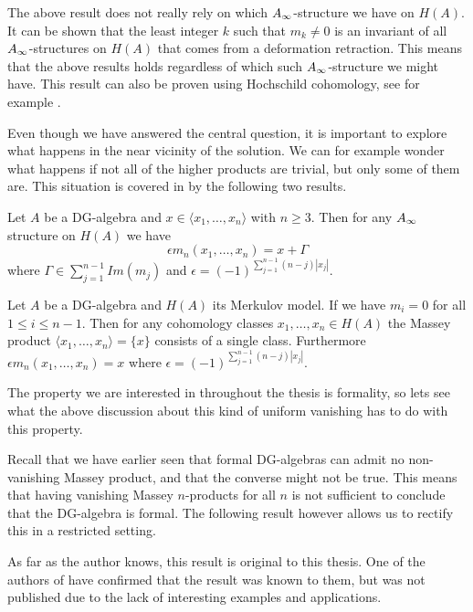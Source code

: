 The above result does not really rely on which $A_{\infty}$-structure we have on $H(A)$. It can be shown that the least integer $k$ such that $m_k \neq 0$ is an invariant of all $A_{\infty}$-structures on $H(A)$ that comes from a deformation retraction. This means that the above results holds regardless of which such $A_{\infty}$-structure we might have. This result can also be proven using Hochschild cohomology, see for example \cite[Theorem 3.3.]{berglund}.

Even though we have answered the central question, it is important to explore what happens in the near vicinity of the solution. We can for example wonder what happens if not all of the higher products are trivial, but only some of them are. This situation is covered in \cite{detection} by the following two results.

\begin{theorem}
Let $A$ be a DG-algebra and $x\in \langle x_1, \ldots, x_n\rangle$ with $n\geq 3$. Then for any $A_{\infty}$ structure on $H(A)$ we have 
\begin{equation*}
    \epsilon m_n(x_1, \ldots, x_n) = x+\Gamma 
\end{equation*}
where $\Gamma \in \sum_{j=1}^{n-1}Im(m_j)$ and $\epsilon = (-1)^{\sum_{j=1}^{n-1} (n-j)|x_j|}$. 
\end{theorem}
\label{thm:infty_massey_recovers_massey}

\begin{corollary}
Let $A$ be a DG-algebra and $H(A)$ its Merkulov model. If we have $m_i=0$ for all $1\leq i\leq n-1$. Then for any cohomology classes $x_1, \ldots, x_n \in H(A)$ the Massey product $\langle x_1, \ldots, x_n\rangle = \{ x\}$ consists of a single class. Furthermore $\epsilon m_n(x_1, \ldots, x_n)=x$ where $\epsilon = (-1)^{\sum_{j=1}^{n-1} (n-j)|x_j|}$.
\end{corollary}
\label{cor:massey_only_one_class}


The property we are interested in throughout the thesis is formality, so lets see what the above discussion about this kind of uniform vanishing has to do with this property. 

Recall that we have earlier seen that formal DG-algebras can admit no non-vanishing Massey product, and that the converse might not be true. This means that having vanishing Massey $n$-products for all $n$ is not sufficient to conclude that the DG-algebra is formal. The following result however allows us to rectify this in a restricted setting. 

As far as the author knows, this result is original to this thesis. One of the authors of \cite{detection} have confirmed that the result was known to them, but was not published due to the lack of interesting examples and applications. 

